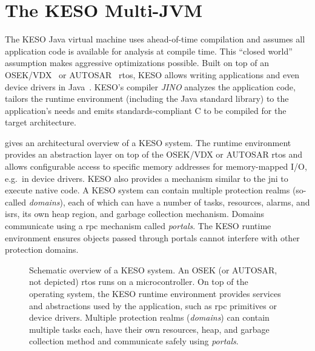 	\section{The KESO Multi-JVM}
		\label{sec:intro:keso}
		The KESO Java virtual machine uses ahead-of-time compilation and assumes all application code is available for
		analysis at compile time. This \enquote{closed world} assumption makes aggressive optimizations possible. Built on
		top of an OSEK/VDX~\cite{OSEKSpec223} or AUTOSAR~\cite{autosar:06:sws_os} \gls{rtos}, KESO allows writing
		applications and even device drivers in Java~\cite{thomm:10:jtres}. KESO's compiler \emph{JINO} analyzes the
		application code, tailors the runtime environment (including the Java standard library) to the application's needs
		and emits standards-compliant C to be compiled for the target architecture.

		 gives an architectural overview of a KESO system. The runtime environment provides an
		abstraction layer on top of the OSEK/VDX or AUTOSAR \gls{rtos} and allows configurable access to specific memory
		addresses for memory-mapped I/O, e.g.\ in device drivers. KESO also provides a mechanism similar to the \gls{jni} to
		execute native code. A KESO system can contain multiple protection realms (so-called \emph{domains}), each of which
		can have a number of tasks, resources, alarms, and \glspl{isr}, its own heap region, and garbage collection
		mechanism. Domains communicate using a \gls{rpc} mechanism called \emph{portals}. The KESO runtime environment
		ensures objects passed through portals cannot interfere with other protection domains.

		\begin{figure}
			\begin{center}
				
			\end{center}
			\caption[Schematic overview of a KESO system]{%
				Schematic overview of a KESO system. An OSEK (or AUTOSAR, not depicted) \gls{rtos} runs on a microcontroller. On
				top of the operating system, the KESO runtime environment provides services and abstractions used by the
				application, such as \gls{rpc} primitives or device drivers. Multiple protection realms (\emph{domains}) can
				contain multiple tasks each, have their own resources, heap, and garbage collection method and communicate
				safely using \emph{portals}.}
			\label{fig:intro:overview}
		\end{figure}


